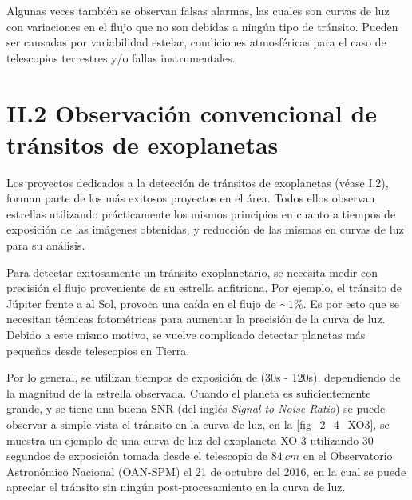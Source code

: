Algunas veces también se observan falsas alarmas, las cuales son curvas de luz con variaciones en el flujo que no son debidas a ningún tipo de tránsito. Pueden ser causadas por variabilidad estelar, condiciones atmosféricas para el caso de telescopios terrestres y/o fallas instrumentales. 

\section*{II.2 Observación convencional de tránsitos de exoplanetas}

Los proyectos dedicados a la detección de tránsitos de exoplanetas (véase I.2), forman parte de los más exitosos proyectos en el área. Todos ellos observan estrellas utilizando prácticamente los mismos principios en cuanto a tiempos de exposición de las imágenes obtenidas, y reducción de las mismas en curvas de luz para su análisis.

Para detectar exitosamente un tránsito exoplanetario, se necesita medir con precisión el flujo proveniente de su estrella anfitriona. Por ejemplo, el tránsito de Júpiter frente a al Sol, provoca una caída en el flujo de $\sim 1\%$. Es por esto que se necesitan técnicas fotométricas para aumentar la precisión de la curva de luz. Debido a este mismo motivo, se vuelve complicado detectar planetas más pequeños desde telescopios en Tierra.

Por lo general, se utilizan tiempos de exposición de (30s - 120s), dependiendo de la magnitud de la estrella observada. Cuando el planeta es suficientemente grande, y se tiene una buena SNR (del inglés \textit{Signal to Noise Ratio}) se puede observar a simple vista el tránsito en la curva de luz, en la \ref{fig_2_4_XO3}, se muestra un ejemplo de una curva de luz del exoplaneta XO-3 \citep{johns2008xo} utilizando 30 segundos de exposición tomada desde el telescopio de $84~cm$ en el Observatorio Astronómico Nacional (OAN-SPM) el 21 de octubre del 2016, en la cual se puede apreciar el tránsito sin ningún post-procesamiento en la curva de luz.

